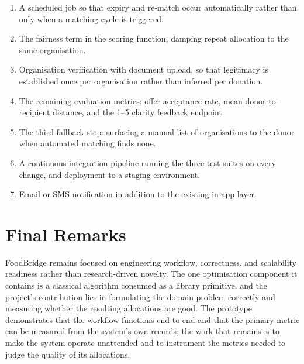\documentclass[12pt,a4paper]{report}
\begin{document}
\begin{enumerate}[leftmargin=*]
    \item A scheduled job so that expiry and re-match occur automatically rather than only when a matching cycle is triggered.
    \item The fairness term in the scoring function, damping repeat allocation to the same organisation.
    \item Organisation verification with document upload, so that legitimacy is established once per organisation rather than inferred per donation.
    \item The remaining evaluation metrics: offer acceptance rate, mean donor-to-recipient distance, and the 1--5 clarity feedback endpoint.
    \item The third fallback step: surfacing a manual list of organisations to the donor when automated matching finds none.
    \item A continuous integration pipeline running the three test suites on every change, and deployment to a staging environment.
    \item Email or SMS notification in addition to the existing in-app layer.
\end{enumerate}

\section{Final Remarks}

FoodBridge remains focused on engineering workflow, correctness, and scalability readiness rather than research-driven novelty. The one optimisation component it contains is a classical algorithm consumed as a library primitive, and the project's contribution lies in formulating the domain problem correctly and measuring whether the resulting allocations are good. The prototype demonstrates that the workflow functions end to end and that the primary metric can be measured from the system's own records; the work that remains is to make the system operate unattended and to instrument the metrics needed to judge the quality of its allocations.
\end{document}

